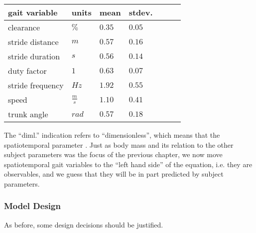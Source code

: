 \begin{table}[p]
\caption{\label{tab:spatiotemporals}}
\centering
\begin{tabular}{l|llllll}
\textbf{gait variable} & \textbf{units}  & \textbf{mean} & \textbf{stdev.} \\[0pt]
\hline
clearance              & \(\%\)          & \(0.35\) & \(0.05\) \\[0pt]
stride distance        & \(m\)           & \(0.57\) & \(0.16\) \\[0pt]
stride duration        & \(s\)           & \(0.56\) & \(0.14\) \\[0pt]
duty factor             & \(1\)           & \(0.63\) & \(0.07\) \\[0pt]
stride frequency       & \(Hz\)          & \(1.92\) & \(0.55\) \\[0pt]
speed                  & \(\frac{m}{s}\) & \(1.10\) & \(0.41\) \\[0pt]
trunk angle            & \(rad\)         & \(0.57\) & \(0.18\) \\[0pt]
\end{tabular}
\end{table}


The ``diml.'' indication refers to ``dimensionless'', which means that the spatiotemporal parameter  \citep[see Ch. \ref{prep:dimensionless};][]{Hof1996,Alexander1983}.
Just as body mass and its relation to the other subject parameters was the focus of the previous chapter, we now move spatiotemporal gait variables to the ``left hand side'' of the equation, i.e. they are observables, and we guess that they will be in part predicted by subject parameters.



\subsubsection{Model Design}
\label{sec:org554cfcf}
As before, some design decisions should be justified.

